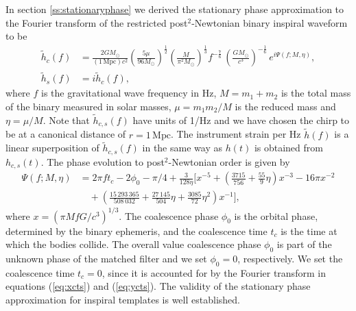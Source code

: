 In section \ref{ss:stationaryphase} we derived the stationary phase
approximation to the Fourier transform of the restricted post$^2$-Newtonian
binary inspiral waveform to be
\begin{align}
\label{eq:spcos}
\tilde{h}_c(f)&=\frac{2GM_\odot}{(1\,\mathrm{Mpc})c^2}
\left(\frac{5\mu}{96M_\odot}\right)^\frac{1}{2}
\left(\frac{M}{\pi^2M_\odot}\right)^\frac{1}{3}
f^{-\frac{7}{6}}\, \left( \frac{GM_\odot}{c^3} \right)^{-\frac{1}{6}}\,
e^{i\Psi(f;M,\eta)},\\
\tilde{h}_s(f)&=i\tilde{h}_c(f),
\label{eq:hsorthog}
\end{align}
where $f$ is the gravitational wave frequency in Hz, $M = m_1+m_2$ 
is the total mass of the binary measured in solar masses, $\mu = m_1 m_2 / M$
is the reduced mass and $\eta = \mu/M$.  Note that $\tilde{h}_{c,s}(f)$ have
units of 1/Hz and we have chosen the chirp to be at a canonical distance of
$r = 1\,\mathrm{Mpc}$.  The instrument strain per Hz $\tilde{h}(f)$ is 
a linear superposition of $\tilde{h}_{c,s}(f)$ in the same way as
$h(t)$ is obtained from $h_{c,s}(t)$. The phase evolution to
post$^2$-Newtonian order is given by
\begin{equation}
\begin{split}
\Psi(f;M,\eta) &= 2\pi ft_c-2\phi_0-\pi/4+\frac{3}{128\eta}\biggl[x^{-5}+
\left(\frac{3715}{756}+\frac{55}{9}\eta\right)x^{-3}
-16\pi x^{-2} \\
&\quad +\left(\frac{15\,293\,365}{508\,032}+\frac{27\,145}{504}\eta
+\frac{3085}{72}\eta^2\right)x^{-1}\biggr],
\label{eq:spphase}
\end{split}
\end{equation}
where $x=(\pi M f G/c^3)^{1/3}$. The coalescence phase $\phi_0$ is the orbital
phase, determined by the binary ephemeris, and the coalescence time $t_c$ is
the time at which the bodies collide. The overall value coalescence phase
$\phi_0$ is part of the unknown phase of the matched filter and we set
$\phi_0=0$, respectively.  We set the coalescence time $t_c = 0$, since it is
accounted for by the Fourier transform in equations (\ref{eq:xcts}) and
(\ref{eq:ycts}).  The validity of the stationary phase approximation for
inspiral templates is well established\cite{Droz:1999qx}.

